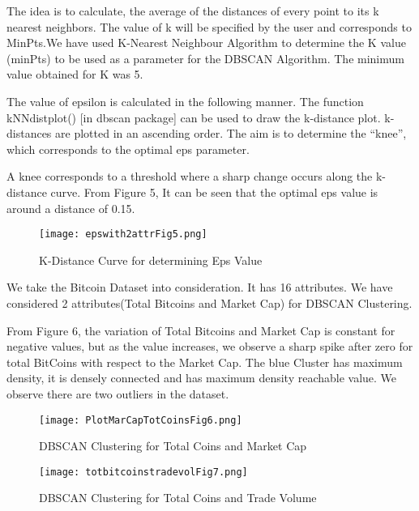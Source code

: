 \documentclass{article}
\begin{document}
The idea is to calculate, the average of the distances of every point to its k nearest neighbors. The value of k will be specified by the user and corresponds to MinPts.We have used K-Nearest Neighbour Algorithm to determine the K value (minPts) to be used as a parameter for the DBSCAN Algorithm. The minimum value obtained for K was 5. \newline

The value of epsilon is calculated in the following manner. The function kNNdistplot() [in dbscan package] can be used to draw the k-distance plot. k-distances are plotted in an ascending order. The aim is to determine the “knee”, which corresponds to the optimal eps parameter. \newline

A knee corresponds to a threshold where a sharp change occurs along the k-distance curve. From Figure 5, It can be seen that the optimal eps value is around a distance of 0.15.


\begin{figure}[h]
    \centering
    \texttt{[image: epswith2attrFig5.png]}
    \caption{K-Distance Curve for determining Eps Value }
    \label{fig:my_label}
\end{figure}

We take the Bitcoin Dataset into consideration. It has 16 attributes. We have considered 2 attributes(Total Bitcoins and Market Cap) for DBSCAN Clustering.\newline

From Figure 6, the variation of Total Bitcoins and Market Cap is constant for negative values, but as the value increases, we observe a sharp spike after zero for total BitCoins with respect to the Market Cap. The blue Cluster has maximum density, it is densely connected and has maximum density reachable value. We observe there are two outliers in the dataset. \newline

\begin{figure}[h]
    \centering
    \texttt{[image: PlotMarCapTotCoinsFig6.png]}
    \caption{DBSCAN Clustering for Total Coins and Market Cap }
    \label{fig:my_label}
\end{figure}


\begin{figure}[h]
    \centering
    \texttt{[image: totbitcoinstradevolFig7.png]}
    \caption{DBSCAN Clustering for Total Coins and Trade Volume }
    \label{fig:my_label}
\end{figure}
\end{document}
